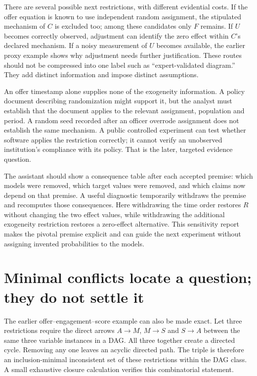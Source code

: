 There are several possible next restrictions, with different evidential
costs. If the offer equation is known to use independent random
assignment, the stipulated mechanism of \(C\) is excluded too; among
these candidates only \(F\) remains. If \(U\) becomes correctly
observed, adjustment can identify the zero effect within \(C\)'s
declared mechanism. If a noisy measurement of \(U\) becomes available,
the earlier proxy example shows why adjustment needs further
justification. These routes should not be compressed into one label such
as ``expert-validated diagram.'' They add distinct information and
impose distinct assumptions.

An offer timestamp alone supplies none of the exogeneity information. A
policy document describing randomization might support it, but the
analyst must establish that the document applies to the relevant
assignment, population and period. A random seed recorded after an
officer overrode assignment does not establish the same mechanism. A
public controlled experiment can test whether software applies the
restriction correctly; it cannot verify an unobserved institution's
compliance with its policy. That is the later, targeted evidence
question.

The assistant should show a consequence table after each accepted
premise: which models were removed, which target values were removed,
and which claims now depend on that premise. A useful diagnostic
temporarily withdraws the premise and recomputes those consequences.
Here withdrawing the time order restores \(R\) without changing the two
effect values, while withdrawing the additional exogeneity restriction
restores a zero-effect alternative. This sensitivity report makes the
pivotal premise explicit and can guide the next experiment without
assigning invented probabilities to the models.

\hypertarget{minimal-conflicts-locate-a-question-they-do-not-settle-it}{%
\section{Minimal conflicts locate a question; they do not settle
it}\label{minimal-conflicts-locate-a-question-they-do-not-settle-it}}

The earlier offer--engagement--score example can also be made exact. Let
three restrictions require the direct arrows \(A\to M\), \(M\to S\) and
\(S\to A\) between the same three variable instances in a DAG. All three
together create a directed cycle. Removing any one leaves an acyclic
directed path. The triple is therefore an inclusion-minimal inconsistent
set of these restrictions within the DAG class. A small exhaustive
closure calculation verifies this combinatorial statement.
\citep{exec13_diagram_restrictions}

